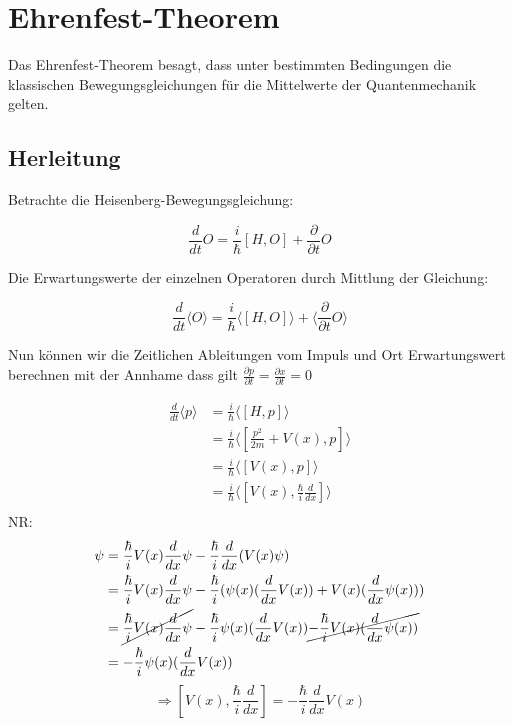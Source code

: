 



\section{Ehrenfest-Theorem}

Das Ehrenfest-Theorem besagt, dass unter bestimmten Bedingungen die klassischen Bewegungsgleichungen für die Mittelwerte der Quantenmechanik gelten.

\subsection{Herleitung}

Betrachte die Heisenberg-Bewegungsgleichung:

\[ \frac{d}{dt} O = \frac{i}{\hbar} [H,O] +\frac{\partial}{\partial t} O \]

Die Erwartungswerte der einzelnen Operatoren durch Mittlung der Gleichung:

\[ \frac{d}{dt} \langle O\rangle  = \frac{i}{\hbar} \langle [H,O]\rangle  + \langle  \frac{\partial}{\partial t}  O\rangle  \]

Nun können wir die Zeitlichen Ableitungen vom Impuls und Ort Erwartungswert berechnen mit der Annhame dass gilt \(\frac{\partial p}{\partial t} = \frac{\partial x}{\partial t} =  0 \)


\begin{align}
 \frac{d}{dt} \langle p \rangle  &= \frac{i}{\hbar} \langle [H,p]\rangle \\
&= \frac{i}{\hbar} \langle [\frac{p^2}{2m}+V(x),p]\rangle   \\
&= \frac{i}{\hbar} \langle [V(x),p]\rangle   \\
&= \frac{i}{\hbar} \langle [V(x),\frac{\hbar}{i}\frac{d}{dx} ]\rangle   \\
\end{align}
NR:
 \begin{align}
[V(x),\frac{\hbar}{i}\frac{d}{dx} ]\psi &=\frac{\hbar}{i} V(x)\frac{d}{dx} \psi - \frac{\hbar}{i}\frac{d}{dx}  (V(x)\psi)\\
&= \frac{\hbar}{i} V(x)\frac{d}{dx} \psi -\frac{\hbar}{i}(\psi(x) (\frac{d}{dx}  V(x)) + V(x) (\frac{d}{dx} \psi(x))  )  \\
&= \cancel{\frac{\hbar}{i} V(x)\frac{d}{dx} \psi} -\frac{\hbar}{i}\psi(x) (\frac{d}{dx}  V(x))\cancel{ -\frac{\hbar}{i} V(x) (\frac{d}{dx} \psi(x))}   \\
&=-\frac{\hbar}{i}\psi(x) (\frac{d}{dx}  V(x))
\end{align}
\[\Rightarrow [V(x),\frac{\hbar}{i}\frac{d}{dx} ] = -\frac{\hbar}{i} \frac{d}{dx}  V(x) \]


